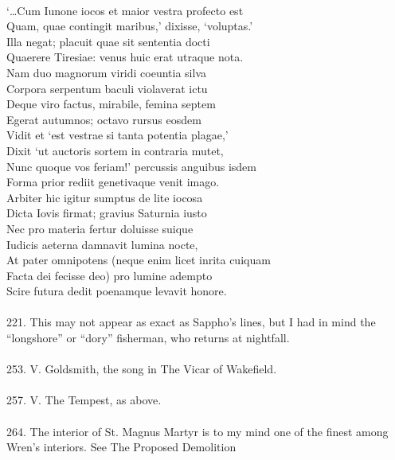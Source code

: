\documentclass{article}
\begin{document}
 \\
\indent     `\ldots Cum Iunone iocos et maior vestra profecto est \\
\indent     Quam, quae contingit maribus,' dixisse, `voluptas.' \\
\indent     Illa negat; placuit quae sit sententia docti \\
\indent     Quaerere Tiresiae: venus huic erat utraque nota. \\
\indent     Nam duo magnorum viridi coeuntia silva \\
\indent     Corpora serpentum baculi violaverat ictu \\
\indent     Deque viro factus, mirabile, femina septem \\
\indent     Egerat autumnos; octavo rursus eosdem \\
\indent     Vidit et `est vestrae si tanta potentia plagae,' \\
\indent     Dixit `ut auctoris sortem in contraria mutet, \\
\indent     Nunc quoque vos feriam!' percussis anguibus isdem \\
\indent     Forma prior rediit genetivaque venit imago. \\
\indent     Arbiter hic igitur sumptus de lite iocosa \\
\indent     Dicta Iovis firmat; gravius Saturnia iusto \\
\indent     Nec pro materia fertur doluisse suique \\
\indent     Iudicis aeterna damnavit lumina nocte, \\
\indent     At pater omnipotens (neque enim licet inrita cuiquam \\
\indent     Facta dei fecisse deo) pro lumine adempto \\
\indent     Scire futura dedit poenamque levavit honore. \\
 \\
221.  This may not appear as exact as Sappho's lines, but I had in mind
the ``longshore'' or ``dory'' fisherman, who returns at nightfall. \\
 \\
253.  V. Goldsmith, the song in The Vicar of Wakefield. \\
 \\
257.  V.  The Tempest, as above. \\
 \\
264.  The interior of St. Magnus Martyr is to my mind one of
the finest among Wren's interiors.  See The Proposed Demolition
\end{document}
